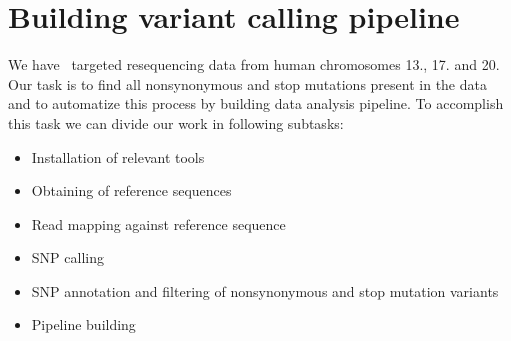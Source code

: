 \section{Building variant calling pipeline}
We have \IonTorrent~targeted resequencing data from human chromosomes 13., 17. and 20. 
Our task is to find all nonsynonymous and stop mutations present in the data
and to automatize this process by building data analysis pipeline.
To accomplish this task we can divide our work in following subtasks:
\begin{itemize}
  \item Installation of relevant tools
  \item Obtaining of reference sequences
  \item Read mapping against reference sequence
  \item SNP calling
  \item SNP annotation and filtering of nonsynonymous and stop mutation variants
  \item Pipeline building
\end{itemize}






